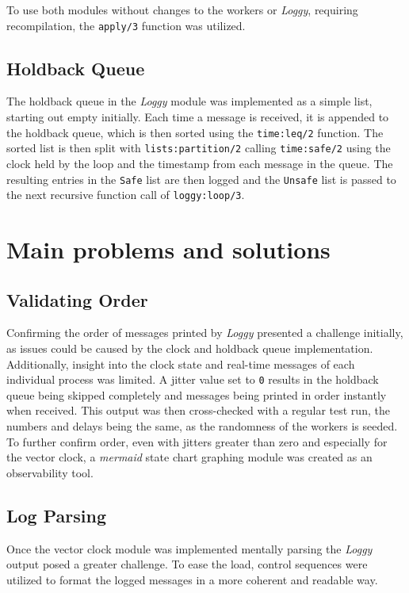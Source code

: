 \documentclass[a4paper, 11pt]{article}
\begin{document}
To use both modules without changes to the workers or \textit{Loggy}, requiring recompilation, the \texttt{apply/3} function was utilized.

\subsection{Holdback Queue}

The holdback queue in the \textit{Loggy} module was implemented as a simple list, starting out empty initially.
Each time a message is received, it is appended to the holdback queue, which is then sorted using the \texttt{time:leq/2} function.
The sorted list is then split with \texttt{lists:partition/2} calling \texttt{time:safe/2} using the clock held by the loop and the timestamp from each message in the queue.
The resulting entries in the \texttt{Safe} list are then logged and the \texttt{Unsafe} list is passed to the next recursive function call of \texttt{loggy:loop/3}.


\section{Main problems and solutions}

\subsection{Validating Order}

Confirming the order of messages printed by \textit{Loggy} presented a challenge initially, as issues could be caused by the clock and holdback queue implementation. Additionally, insight into the clock state and real-time messages of each individual process was limited. 
A jitter value set to \texttt{0} results in the holdback queue being skipped completely and messages being printed in order instantly when received. This output was then cross-checked with a regular test run, the numbers and delays being the same, as the randomness of the workers is seeded.
To further confirm order, even with jitters greater than zero and especially for the vector clock, a \textit{mermaid} state chart graphing module was created as an observability tool. 

\subsection{Log Parsing}
Once the vector clock module was implemented mentally parsing the \textit{Loggy} output posed a greater challenge.
To ease the load, control sequences were utilized to format the logged messages in a more coherent and readable way.
\end{document}
